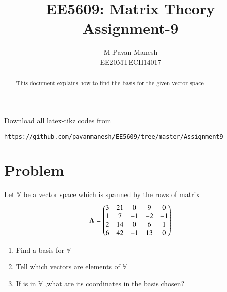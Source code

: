 \documentclass[journal,12pt,twocolumn]{IEEEtran}
\begin{document}
     \def\rightbox#1{\makebox[0in][r]{#1}}
     \def\centbox#1{\makebox[0in]{#1}}
     \def\topbox#1{\raisebox{-\baselineskip}[0in][0in]{#1}}
     \def\midbox#1{\raisebox{-0.5\baselineskip}[0in][0in]{#1}}
\vspace{3cm}
\title{EE5609: Matrix Theory\\
          Assignment-9\\}
\author{M Pavan Manesh\\
EE20MTECH14017 }
\maketitle
\newpage
\bigskip
\renewcommand{\thefigure}{\theenumi}
\renewcommand{\thetable}{\theenumi}
\begin{abstract}
This document explains how to find the basis for the given vector space
\end{abstract}
Download all latex-tikz codes from 
%
\begin{lstlisting}
https://github.com/pavanmanesh/EE5609/tree/master/Assignment9
\end{lstlisting}
%
\section{Problem}
Let $\mathbb{V}$ be a vector space which is spanned by the rows of matrix
\begin{align}
    \mathbf{A} = \begin{pmatrix}3&21&0&9&0\\1&7&-1&-2&-1\\2&14&0&6&1\\6&42&-1&13&0\end{pmatrix}\label{eq:mat}
\end{align}
\begin{enumerate}[label=\alph*.]
\item Find a basis for $\mathbb{V}$
\item Tell which vectors  are elements of $\mathbb{V}$ 
\item If  is in $\mathbb{V}$ ,what are its coordinates in the basis chosen?
\end{enumerate}
\end{document}
